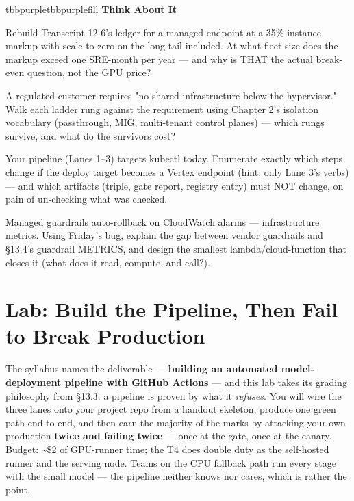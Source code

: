 \begin{calloutbox}{tbbpurple}{tbbpurplefill}
{\normalsize\bfseries\color{tbbpurple}Think About It}\par\vspace{3pt}
\begin{tbbitemize}
  \item Rebuild Transcript 12-6's ledger for a managed endpoint at a 35\% instance markup with scale-to-zero on the long tail included. At what fleet size does the markup exceed one SRE-month per year — and why is THAT the actual break-even question, not the GPU price?
  \item A regulated customer requires "no shared infrastructure below the hypervisor." Walk each ladder rung against the requirement using Chapter 2's isolation vocabulary (passthrough, MIG, multi-tenant control planes) — which rungs survive, and what do the survivors cost?
  \item Your pipeline (Lanes 1–3) targets kubectl today. Enumerate exactly which steps change if the deploy target becomes a Vertex endpoint (hint: only Lane 3's verbs) — and which artifacts (triple, gate report, registry entry) must NOT change, on pain of un-checking what was checked.
  \item Managed guardrails auto-rollback on CloudWatch alarms — infrastructure metrics. Using Friday's bug, explain the gap between vendor guardrails and §13.4's guardrail METRICS, and design the smallest lambda/cloud-function that closes it (what does it read, compute, and call?).
\end{tbbitemize}
\end{calloutbox}

\section{Lab: Build the Pipeline, Then Fail to Break Production}

The syllabus names the deliverable — \textbf{building an automated model-deployment pipeline with GitHub Actions} — and this lab takes its grading philosophy from §13.3: a pipeline is proven by what it \textit{refuses}. You will wire the three lanes onto your project repo from a handout skeleton, produce one green path end to end, and then earn the majority of the marks by attacking your own production \textbf{twice and failing twice} — once at the gate, once at the canary. Budget: \textasciitilde{}\$2 of GPU-runner time; the T4 does double duty as the self-hosted runner and the serving node. Teams on the CPU fallback path run every stage with the small model — the pipeline neither knows nor cares, which is rather the point.

